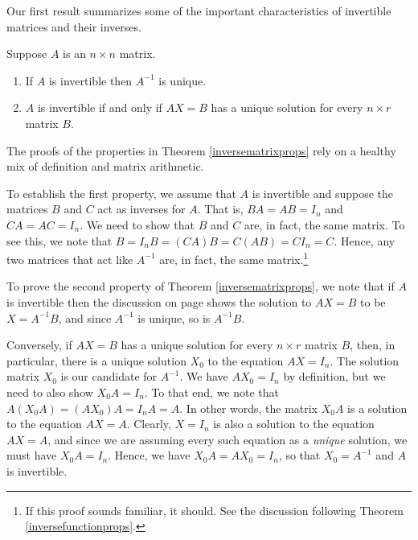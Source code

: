 \documentclass{ximera}
\begin{document}
Our first result summarizes some of the important characteristics of invertible matrices and their inverses.  

\smallskip

\colorbox{ResultColor}{\bbm

\begin{thm}  \label{inversematrixprops}  Suppose $A$ is an $n \times n$ matrix. 


\vspace{-.1in} 

\begin{enumerate}

\item  If $A$ is invertible then $A^{-1}$ is unique.

\vspace{-.1in}

\item  $A$ is invertible if and only if $AX = B$ has a unique solution for every $n \times r$ matrix $B$.  

\end{enumerate}

\end{thm}

\ebm}

\smallskip

The proofs of the properties in Theorem \ref{inversematrixprops} rely on a healthy mix of definition and matrix arithmetic.  

To establish the first property, we assume that $A$ is invertible and suppose the matrices $B$ and $C$ act as inverses for $A$.  That is, $BA = AB = I_{n}$ and $CA = AC = I_{n}$.  We need to show that $B$ and $C$ are, in fact, the same matrix.  To see this, we note that $B = I_{n}B = (CA)B = C(AB) = CI_{n} = C$. Hence, any two matrices that act like $A^{-1}$ are, in fact, the same matrix.\footnote{If this proof sounds familiar, it should. See the discussion following Theorem \ref{inversefunctionprops}.}  

To prove the second property of Theorem  \ref{inversematrixprops}, we note that if $A$ is invertible then the discussion on page \pageref{solvingmatrixeqn} shows the solution to $AX=B$ to be $X = A^{-1}B$, and since $A^{-1}$ is unique, so is $A^{-1}B$. 

Conversely, if $AX = B$ has a unique solution for every $n \times r$ matrix $B$, then, in particular, there is a unique solution $X_{0}$ to the equation $AX = I_{n}$.  The solution matrix $X_{0}$ is our candidate for $A^{-1}$. We have $AX_{0} = I_{n}$ by definition, but we need to also show $X_{0}A = I_{n}$.  To that end, we note that $A\left(X_{0}A\right) = \left(AX_{0}\right)A = I_{n}A = A$.  In other words, the matrix $X_{0}A$ is a solution to the equation $AX = A$.  Clearly, $X=I_{n}$ is also a solution to the equation $AX = A$, and since we are assuming every such equation as a \textit{unique} solution, we must have $X_{0}A = I_{n}$.  Hence, we have $X_{0}A = AX_{0} = I_{n}$, so that $X_{0} = A^{-1}$ and $A$ is invertible.  
\end{document}
